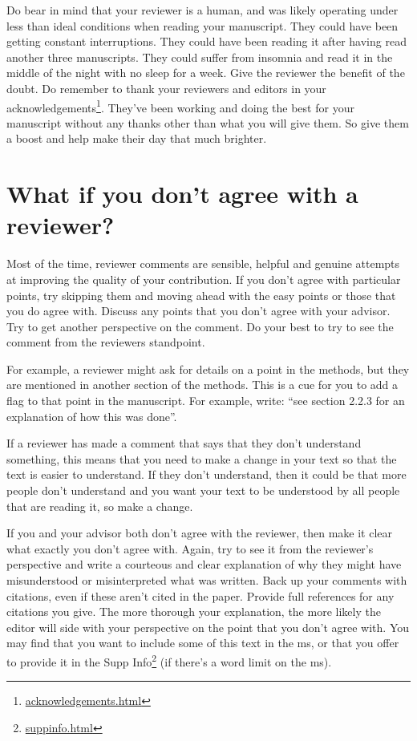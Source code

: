 \documentclass[
]{krantz}
\renewcommand{\href}[2]{#2\footnote{\url{#1}}}
\begin{document}
Do bear in mind that your reviewer is a human, and was likely operating under less than ideal conditions when reading your manuscript. They could have been getting constant interruptions. They could have been reading it after having read another three manuscripts. They could suffer from insomnia and read it in the middle of the night with no sleep for a week. Give the reviewer the benefit of the doubt. Do remember to thank your reviewers and editors in your \href{acknowledgements.html}{acknowledgements}. They've been working and doing the best for your manuscript without any thanks other than what you will give them. So give them a boost and help make their day that much brighter.

\hypertarget{what-if-you-dont-agree-with-a-reviewer}{%
\section{What if you don't agree with a reviewer?}\label{what-if-you-dont-agree-with-a-reviewer}}

Most of the time, reviewer comments are sensible, helpful and genuine attempts at improving the quality of your contribution. If you don't agree with particular points, try skipping them and moving ahead with the easy points or those that you do agree with. Discuss any points that you don't agree with your advisor. Try to get another perspective on the comment. Do your best to try to see the comment from the reviewers standpoint.

For example, a reviewer might ask for details on a point in the methods, but they are mentioned in another section of the methods. This is a cue for you to add a flag to that point in the manuscript. For example, write: ``see section 2.2.3 for an explanation of how this was done''.

If a reviewer has made a comment that says that they don't understand something, this means that you need to make a change in your text so that the text is easier to understand. If they don't understand, then it could be that more people don't understand and you want your text to be understood by all people that are reading it, so make a change.

If you and your advisor both don't agree with the reviewer, then make it clear what exactly you don't agree with. Again, try to see it from the reviewer's perspective and write a courteous and clear explanation of why they might have misunderstood or misinterpreted what was written. Back up your comments with citations, even if these aren't cited in the paper. Provide full references for any citations you give. The more thorough your explanation, the more likely the editor will side with your perspective on the point that you don't agree with. You may find that you want to include some of this text in the ms, or that you offer to provide it in the \href{suppinfo.html}{Supp Info} (if there's a word limit on the ms).
\end{document}
